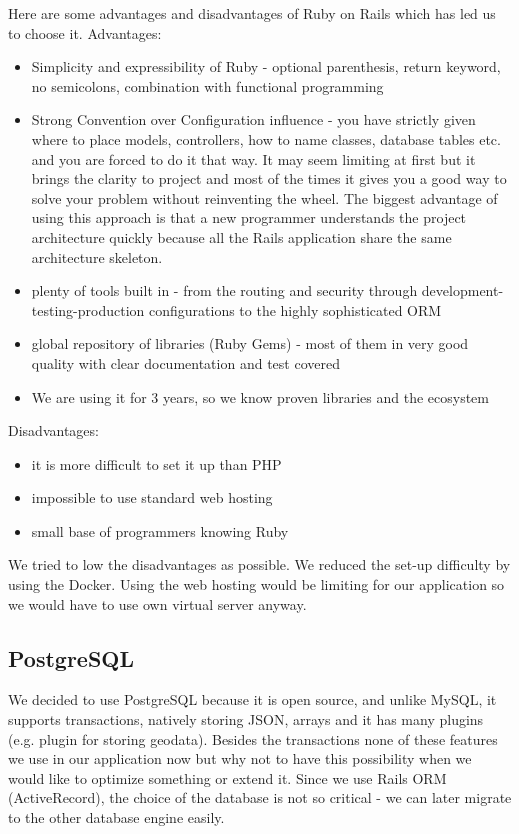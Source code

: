 Here are some advantages and disadvantages of Ruby on Rails which has led us to choose it.
Advantages:
\begin{itemize}
	\item Simplicity and expressibility of Ruby - optional parenthesis, return keyword, no semicolons, combination with functional programming 
	\item Strong Convention over Configuration influence - you have strictly given where to place models, controllers, how to name classes, database tables etc. and you are forced to do it that way. It may seem limiting at first but it brings the clarity to project and most of the times it gives you a good way to solve your problem without reinventing the wheel. The biggest advantage of using this approach is that a new programmer understands the project architecture quickly because all the Rails application share the same architecture skeleton.
	\item plenty of tools built in - from the routing and security through development-testing-production configurations to the highly sophisticated ORM
	\item global repository of libraries (Ruby Gems) - most of them in very good quality with clear documentation and test covered
	\item We are using it for 3 years, so we know proven libraries and the ecosystem
\end{itemize} 
Disadvantages:
\begin{itemize}
	\item it is more difficult to set it up than PHP
	\item impossible to use standard web hosting
	\item small base of programmers knowing Ruby
\end{itemize}

We tried to low the disadvantages as possible. We reduced the set-up difficulty by using the Docker. Using the web hosting would be limiting for our application so we would have to use own virtual server anyway. 

\subsection{PostgreSQL}
We decided to use PostgreSQL because it is open source, and unlike MySQL, it supports transactions, natively storing JSON, arrays and it has many plugins (e.g. plugin for storing geodata). Besides the transactions none of these features we use in our application now but why not to have this possibility when we would like to optimize something or extend it. Since we use Rails ORM (ActiveRecord), the choice of the database is not so critical - we can later migrate to the other database engine easily.
